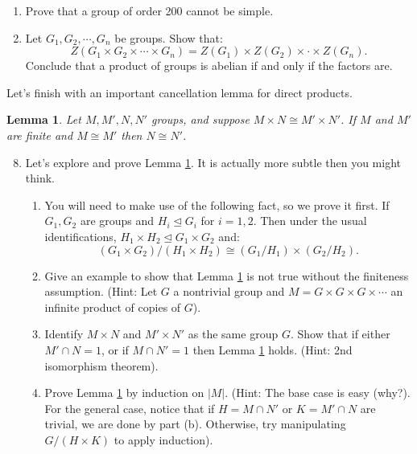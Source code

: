 \documentclass[11pt]{article}
\newtheorem{lemma}{Lemma}
\newcommand{\bF}{\mathbb{F}}
\begin{document}
\begin{enumerate}
{\begin{enumerate}
{    The subset of \textit{strictly upper triangular matrices} is:
    \[\overline T = \left\{\begin{pmatrix}1 & b\\0 & 1\end{pmatrix}\in GL_2(\bF_p)\right\}.\]
    Show that $T$ and $\overline T$ are subgroups of $GL_2(\bF_p)$.  We will see that they are not normal.
    }
    \item{
    Show that $\overline T$ is a Sylow $p$-subgroup of $GL_2(\bF_p)$ and of $T$.
    }
    \item{
    Show that $GL_2(\bF_p)$ has $p+1$ Sylow $p$-subgroups.
    }
    \item{
    Prove that $T$ is not normal in $GL_2(\bF_p)$.  (Hint: use Lemma \ref{LemmaA}).
    }
  \end{enumerate}
  }
  \item Prove that a group of order 200 cannot be simple.
  \item{
  Let $G_1,G_2,\cdots,G_n$ be groups.  Show that:
  \[Z(G_1\times G_2\times\cdots\times G_n) = Z(G_1)\times Z(G_2)\times\cdot\times Z(G_n).\]
  Conclude that a product of groups is abelian if and only if the factors are.
  }
\end{enumerate}
Let's finish with an important cancellation lemma for direct products.
\begin{lemma}\label{cancellation}
  Let $M,M',N,N'$ groups, and suppose $M\times N\cong M'\times N'$.  If $M$ and $M'$ are finite and $M\cong M'$ then $N\cong N'$.
\end{lemma}
\begin{enumerate}
  \setcounter{enumi}{7}
  \item{
  Let's explore and prove Lemma \ref{cancellation}.  It is actually more subtle then you might think.
  \begin{enumerate}
    \item{
    You will need to make use of the following fact, so we prove it first.  If $G_1,G_2$ are groups and $H_i\unlhd G_i$ for $i=1,2$.  Then under the usual identifications, $H_1\times H_2\unlhd G_1\times G_2$ and:
    \[(G_1\times G_2)/(H_1\times H_2)\cong(G_1/H_1)\times(G_2/H_2).\]
    }
    \item{
    Give an example to show that Lemma \ref{cancellation} is not true without the finiteness assumption.  (Hint: Let $G$ a nontrivial group and $M = G\times G\times G\times\cdots$ an infinite product of copies of $G$).
    }
    \item{
    Identify $M\times N$ and $M'\times N'$ as the same group $G$.  Show that if either  $M'\cap N = 1$, or if $M\cap N'=1$ then Lemma \ref{cancellation} holds.  (Hint: 2nd isomorphism theorem).
    }
    \item{
    Prove Lemma \ref{cancellation} by induction on $|M|$.  (Hint: The base case is easy (why?).  For the general case, notice that if $H = M\cap N'$ or $K = M'\cap N$ are trivial, we are done by part (b).  Otherwise, try manipulating $G/(H\times K)$ to apply induction).
    }
  \end{enumerate}
  }
\end{enumerate}
\end{document}
